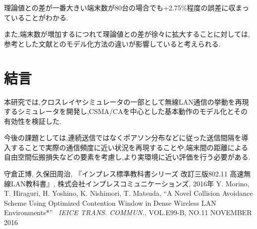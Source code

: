 \documentclass[a4paper, 10pt]{ltjsarticle}
\begin{document}
理論値との差が一番大きい端末数が80台の場合でも+2.75\%程度の誤差に収まっていることがわかる.

また,端末数が増加するにつれて理論値との差が徐々に拡大することに対しては,参考とした文献\cite{paper}とのモデル化方法の違いが影響していると考えられる.

\section{結言}
本研究では,クロスレイヤシミュレータの一部として無線LAN通信の挙動を再現するシミュレータを開発し,CSMA/CAを中心とした基本動作のモデル化とその有効性を検証した.

今後の課題としては,連続送信ではなくポアソン分布などに従った送信間隔を導入することで実際の通信頻度に近い状況を再現することや,端末間の距離による自由空間伝搬損失などの要素を考慮し,より実環境に近い評価を行う必要がある.




\begin{thebibliography}{9}
  守倉正博, 久保田周治, 『インプレス標準教科書シリーズ 改訂三版802.11 高速無線LAN教科書』, 株式会社インプレスコミュニケーションズ, 2016年
  Y. Morino, T. Hiraguri, H. Yoshino, K. Nishimori, T. Matsuda, ``A Novel Collision Avoidance Scheme Using Optimized Contention Window in Dense Wireless LAN Environments*'' \, \textit{IEICE TRANS. COMMUN.}, VOL.E99-B, NO.11 NOVEMBER 2016
\end{thebibliography}
\end{document}
